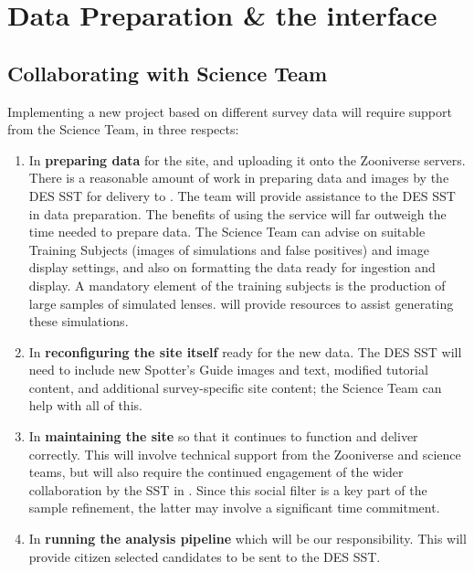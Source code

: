 \documentclass[a4paper,twocolumn]{article}
\begin{document}

\section{Data Preparation \& the \SW interface}
\label{sec:data}

\subsection{Collaborating with \SW Science Team}

Implementing a new project based on different survey data will require support from the \SW Science Team, in three respects: 

\begin{enumerate}

\item In {\bf preparing data} for the site, and uploading it onto the
Zooniverse servers. There is a reasonable amount of work in preparing data and images by the DES SST for delivery to \SW. The \SW team will provide assistance to the DES SST in data preparation. The benefits of using the \SW service will far outweigh the time needed to prepare data.  The \SW Science Team can advise on suitable Training
Subjects (images of simulations and false positives) and image display settings, and also on formatting the data
ready for ingestion and display. A mandatory element of the training subjects is the production of large samples of simulated lenses. \SW will provide resources to assist generating these simulations. 

\item In {\bf reconfiguring the site itself} ready for the new data. The DES
SST will need to include new Spotter's Guide images and text,
modified tutorial content, and additional survey-specific site content;
the \SW Science Team can help with all of this.

\item In {\bf maintaining the site} so that it continues to function and deliver
correctly. This will involve technical support from the Zooniverse and \SW science teams,
but will also require the continued engagement of the wider
collaboration by the SST in \Talk. Since this social filter is
a key part of the sample refinement, the latter may involve a
significant time commitment.

\item In {\bf running the \SW analysis pipeline} which will be our responsibility. This will provide citizen selected candidates to be sent to the DES SST.

\end{enumerate}
\end{document}
